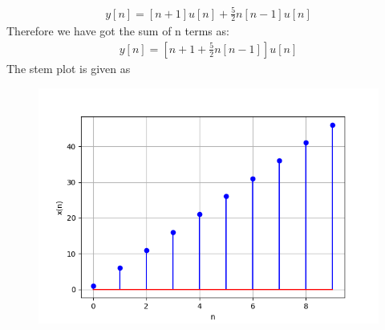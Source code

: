 \documentclass[journal,12pt,twocolumn]{IEEEtran}
\newcommand{\brak}[1]{\left[#1\right]}
\theoremstyle{remark}
\begin{document}
\begin{align}
y\brak{n} = \brak{n+1 }u\brak{n} + \frac{5}{2} n\brak{n-1} u\brak{n}
\end{align}
Therefore we have got the sum of n terms as:
\begin{align}
y\brak{n}= \brak{n+1 + \frac{5}{2} n\brak{n-1}}u\brak{n}
\end{align}
The stem plot is given as
\begin{figure}[h!]
  \centering
  \includegraphics[width=\columnwidth]{figs/stem.png}
  \label{fig:Stem_Plot}
\end{figure}
\end{document}
